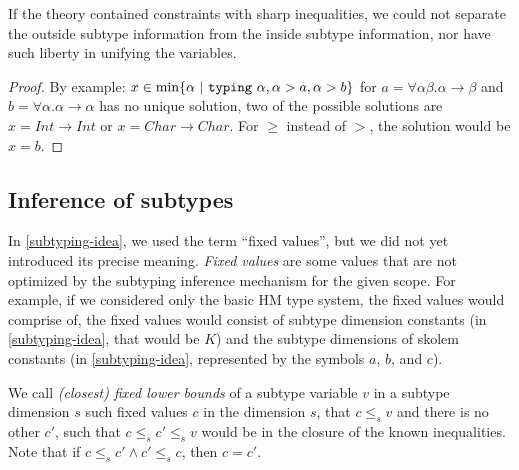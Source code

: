 \begin{observe}
    If the theory contained constraints with sharp inequalities, we could not separate the outside subtype information from the inside subtype information, nor have such liberty in unifying the variables.

    \begin{proof}
        By example: $x \in \min \{ \alpha \ |\  \mathtt{typing}\ \alpha, \alpha > a, \alpha > b \}$ for $a = \forall \alpha \beta . \alpha \to \beta$ and $b = \forall \alpha . \alpha \to \alpha$ has no unique solution, two of the possible solutions are $x = Int \to Int$ or $x = Char \to Char$. For $\geq$ instead of $>$, the solution would be $x = b$.
    \end{proof}
\end{observe}

\subsection{Inference of subtypes}
\label{sec:inferSub}

In \cref{subtyping-idea}, we used the term ``fixed values'', but we did not yet introduced its precise meaning. \emph{Fixed values} are some values that are not optimized by the subtyping inference mechanism for the given scope. For example, if we considered only the basic HM type system, the fixed values would comprise of, the fixed values would consist of subtype dimension constants (in \cref{subtyping-idea}, that would be $K$) and the subtype dimensions of skolem constants (in \cref{subtyping-idea}, represented by the symbols $a$, $b$, and $c$).

We call \emph{(closest) fixed lower bounds} of a subtype variable $v$ in a subtype dimension $s$ such fixed values $c$ in the dimension $s$, that $c \leq_s v$ and there is no other $c'$, such that $c \leq_s c' \leq_s v$ would be in the closure of the known inequalities. Note that if $c \leq_s c' \land c' \leq_s c$, then $c = c'$.

